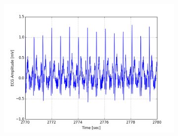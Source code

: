 \documentclass[paper=a4, fontsize=11pt]{scrartcl}
\numberwithin{equation}{section}		%
\numberwithin{figure}{section}			%
\numberwithin{table}{section}		    %
\begin{document}
\begin{appendices}
\begin{figure}[H]
\begin{subfigure}[b]{0.3\textwidth}
		\includegraphics[width=\textwidth]{sim/ecg_48}
	\end{subfigure}
\end{figure}


\end{appendices}
\end{document}
